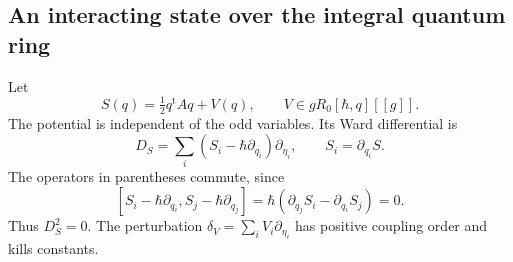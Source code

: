 \subsection{An interacting state over the integral quantum ring}

Let
\[
 S(q)=\tfrac12q^{\mathrm t}Aq+V(q),\qquad
 V\in gR_0[\hbar,q][[g]].
\]
The potential is independent of the odd variables. Its Ward
differential is
\begin{equation}\label{eq:vol2-potential-ward}
 D_S=\sum_i(S_i-\hbar\partial_{q_i})\partial_{\eta_i},
 \qquad S_i=\partial_{q_i}S.
\end{equation}
The operators in parentheses commute, since
\[
 [S_i-\hbar\partial_{q_i},S_j-\hbar\partial_{q_j}]
     =\hbar(\partial_{q_j}S_i-\partial_{q_i}S_j)=0.
\]
Thus $D_S^2=0$. The perturbation
$\delta_V=\sum_iV_i\partial_{\eta_i}$ has positive coupling
order and kills constants.

